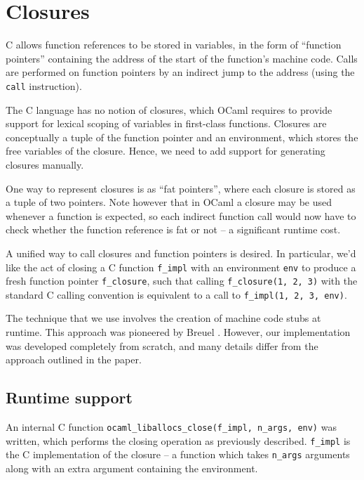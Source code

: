 \documentclass[12pt,a4paper,twoside,openright]{report}
\begin{document}
\section{Closures}\label{closures}

C allows function references to be stored in variables, in the form of
``function pointers'' containing the address of the start of the function's
machine code. Calls are performed on function pointers by an indirect jump to
the address (using the \lstinline!call! instruction).

The C language has no notion of closures, which OCaml requires to provide
support for lexical scoping of variables in first-class functions. Closures are
conceptually a tuple of the function pointer and an environment, which stores
the free variables of the closure. Hence, we need to add support for generating
closures manually.

One way to represent closures is as ``fat pointers'', where each closure is
stored as a tuple of two pointers. Note however that in OCaml a closure may be
used whenever a function is expected, so each indirect function call would now
have to check whether the function reference is fat or not -- a significant
runtime cost.

A unified way to call closures and function pointers is desired. In
particular, we'd like the act of closing a C function \lstinline!f_impl! with
an environment \lstinline!env! to produce a fresh function pointer
\lstinline!f_closure!, such that calling
\lstinline!f_closure(1, 2, 3)!
with the standard C calling convention is equivalent to a call to
\lstinline!f_impl(1, 2, 3, env)!.

The technique that we use involves the creation of machine code stubs at
runtime. This approach was pioneered by Breuel \cite{breuel88}. However, our implementation
was developed completely from scratch, and many details differ from the
approach outlined in the paper.

\subsection{Runtime support}\label{closures-runtime-support}

An internal C function \lstinline{ocaml_liballocs_close(f_impl, n_args, env)}
was written, which performs the closing operation as previously described.
\lstinline!f_impl! is the C implementation of the closure -- a function which
takes \lstinline!n_args! arguments along with an extra argument containing the environment.
\end{document}
